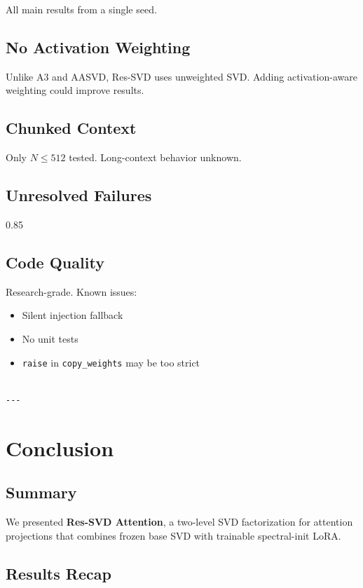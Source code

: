 All main results from a single seed.

\subsection{No Activation Weighting}

Unlike A3 and AASVD, Res-SVD uses unweighted SVD. Adding activation-aware 
weighting could improve results.

\subsection{Chunked Context}

Only $N \leq 512$ tested. Long-context behavior unknown.

\subsection{Unresolved Failures}

0.85

\subsection{Code Quality}

Research-grade. Known issues:
\begin{itemize}
\item Silent injection fallback
\item No unit tests
\item \texttt{raise} in \texttt{copy\_weights} may be too strict
\end{itemize}
\begin{lstlisting}

---
\end{lstlisting}

\section{Conclusion}

\subsection{Summary}

We presented \textbf{Res-SVD Attention}, a two-level SVD factorization for 
attention projections that combines frozen base SVD with trainable 
spectral-init LoRA.

\subsection{Results Recap}

